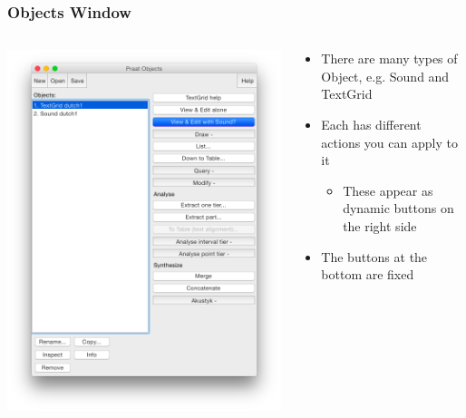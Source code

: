 \documentclass[handout]{beamer}
\begin{document}
\begin{frame}[fragile]
\frametitle{Objects Window}
    
\begin{columns}[]
  \begin{column}{0.5\textwidth}
    \includegraphics[width=\textwidth]{graphics/objectswindow.png}
  \end{column}

  \begin{column}{0.5\textwidth}
    \begin{itemize}
        \item <1-> There are many types of Object, e.g. Sound and TextGrid
        \item <2-> Each has different actions you can apply to it \begin{itemize}
            \item These appear as dynamic buttons on the right side
        \end{itemize}
        \item <3-> The buttons at the bottom are fixed
    \end{itemize}
  \end{column}
\end{columns}

\end{frame}
\end{document}
